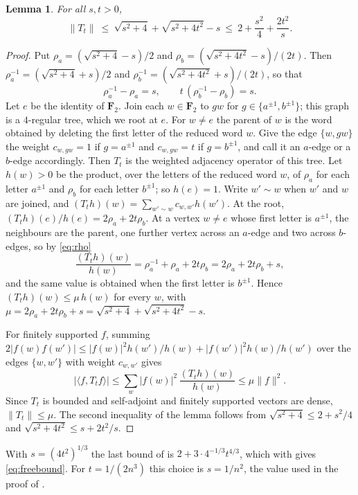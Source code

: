\documentclass[11pt]{article}
\newtheorem{lemma}[theorem]{Lemma}
\theoremstyle{remark}
\begin{document}
\begin{lemma}\label{lem:free}
For all $s,t>0$,
\[
  \|T_t\|\ \le\ \sqrt{s^2+4}+\sqrt{s^2+4t^2}-s\ \le\ 2+\frac{s^2}4+\frac{2t^2}s .
\]
\end{lemma}

\begin{proof}
Put $\rho_a=(\sqrt{s^2+4}-s)/2$ and $\rho_b=(\sqrt{s^2+4t^2}-s)/(2t)$. Then $\rho_a^{-1}=(\sqrt{s^2+4}+s)/2$ and
$\rho_b^{-1}=(\sqrt{s^2+4t^2}+s)/(2t)$, so that
\begin{equation}\label{eq:rho}
  \rho_a^{-1}-\rho_a=s,\qquad t\,(\rho_b^{-1}-\rho_b)=s .
\end{equation}
Let $e$ be the identity of $\mathbf F_2$. Join each $w\in\mathbf F_2$ to $gw$ for $g\in\{a^{\pm1},b^{\pm1}\}$; this
graph is a $4$-regular tree, which we root at $e$. For $w\ne e$ the parent of $w$ is the word obtained by deleting
the first letter of the reduced word $w$. Give the
edge $\{w,gw\}$ the weight $c_{w,gw}=1$ if $g=a^{\pm1}$ and $c_{w,gw}=t$ if $g=b^{\pm1}$, and call it an $a$-edge or
a $b$-edge accordingly. Then $T_t$ is the weighted adjacency operator of this tree. Let $h(w)>0$ be the product, over the letters of the reduced word $w$, of $\rho_a$ for each letter
$a^{\pm1}$ and $\rho_b$ for each letter $b^{\pm1}$; so $h(e)=1$. Write $w'\sim w$ when $w'$ and $w$ are joined, and $(T_th)(w)=\sum_{w'\sim w}c_{w,w'}h(w')$. At the
root, $(T_th)(e)/h(e)=2\rho_a+2t\rho_b$. At a vertex $w\ne e$ whose first letter is $a^{\pm1}$, the neighbours are the
parent, one further vertex across an $a$-edge and two across $b$-edges, so by \eqref{eq:rho}
\[
  \frac{(T_th)(w)}{h(w)}=\rho_a^{-1}+\rho_a+2t\rho_b=2\rho_a+2t\rho_b+s ,
\]
and the same value is obtained when the first letter is $b^{\pm1}$. Hence $(T_th)(w)\le\mu\,h(w)$ for every $w$, with
$\mu=2\rho_a+2t\rho_b+s=\sqrt{s^2+4}+\sqrt{s^2+4t^2}-s$.

For finitely supported $f$, summing $2|f(w)f(w')|\le|f(w)|^2h(w')/h(w)+|f(w')|^2h(w)/h(w')$ over the edges
$\{w,w'\}$ with weight $c_{w,w'}$ gives
\[
  |\langle f,T_tf\rangle|\le\sum_w|f(w)|^2\,\frac{(T_th)(w)}{h(w)}\le\mu\|f\|^2 .
\]
Since $T_t$ is bounded and self-adjoint and finitely supported vectors are dense, $\|T_t\|\le\mu$. The second
inequality of the lemma follows from $\sqrt{s^2+4}\le 2+s^2/4$ and $\sqrt{s^2+4t^2}\le s+2t^2/s$.
\end{proof}

With $s=(4t^2)^{1/3}$ the last bound of  is $2+3\cdot 4^{-1/3}t^{4/3}$, which with
 gives \eqref{eq:freebound}. For $t=1/(2n^3)$ this choice is $s=1/n^2$, the value used in the proof of .
\end{document}
